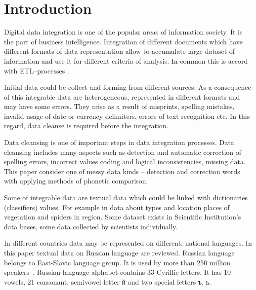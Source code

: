 \documentclass[conference,a4paper]{IEEEtran}
\begin{document}





%
\IEEEpeerreviewmaketitle



\section{Introduction}
Digital data integration is one of the popular areas of information society. It is the part of business intelligence. Integration of different documents which have different formats of data representation allow to accumulate large dataset of information and use it for different criteria of analysis. In common this is accord with ETL--processes \cite{Storeya-2017}.

Initial data could be collect and forming from different sources. As a consequence of this integrable data are heterogeneous, represented in different formats and may have some errors. They arise as a result of misprints, spelling mistakes, invalid usage of date or currency delimiters, errors of text recognition etc. In this regard, data cleanse is required before the integration.

Data cleansing is one of important steps in data integration processes. Data cleansing includes many aspects such as detection and automatic correction of spelling errors, incorrect values coding and logical inconsistencies, missing data. This paper consider one of messy data kinds -- detection and correction words with applying methods of phonetic comparison.

Some of integrable data are textual data which could be linked with dictionaries (classifiers) values. For example in data about types and location places of vegetation and spiders in region. Some dataset exists in Scientific Institution's data bases, some data collected by scientists individually.

In different countries data may be represented on different, national languages. In this paper textual data on Russian language are reviewed. Russian language belongs to East-Slavic language group. It is used by more than 250 million speakers~\cite{Cubberley-2002}. Russian language alphabet contains 33 Cyrillic letters. It has 10 vowels, 21 consonant, semivowel letter й and two special letters ъ, ь.
\end{document}
